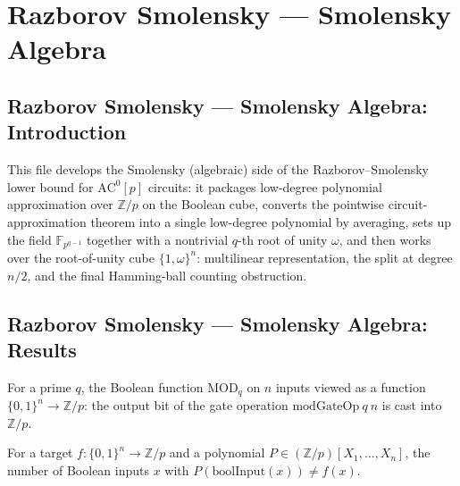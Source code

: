 \section{Razborov Smolensky --- Smolensky Algebra}
\subsection*{Razborov Smolensky --- Smolensky Algebra: Introduction}

This file develops the Smolensky (algebraic) side of the Razborov--Smolensky lower bound
for $\mathrm{AC}^0[p]$ circuits: it packages low-degree polynomial approximation over
$\mathbb{Z}/p$ on the Boolean cube, converts the pointwise circuit-approximation theorem
into a single low-degree polynomial by averaging, sets up the field
$\mathbb{F}_{p^{q-1}}$ together with a nontrivial $q$-th root of unity $\omega$, and then
works over the root-of-unity cube $\{1,\omega\}^n$: multilinear representation, the split
at degree $n/2$, and the final Hamming-ball counting obstruction.

\subsection*{Razborov Smolensky --- Smolensky Algebra: Results}

\begin{definition}
\label{RazborovSmolensky.modQTarget}
\leanok
{}
For a prime $q$, the Boolean function $\mathrm{MOD}_q$ on $n$ inputs viewed as a function
$\{0,1\}^n \to \mathbb{Z}/p$: the output bit of the gate operation $\mathrm{modGateOp}\ q\ n$
is cast into $\mathbb{Z}/p$.
\end{definition}

\begin{definition}
\label{RazborovSmolensky.badInputCount}
\leanok
{}
For a target $f : \{0,1\}^n \to \mathbb{Z}/p$ and a polynomial
$P \in (\mathbb{Z}/p)[X_1,\dots,X_n]$, the number of Boolean inputs $x$ with
$P(\mathrm{boolInput}(x)) \neq f(x)$.
\end{definition}

